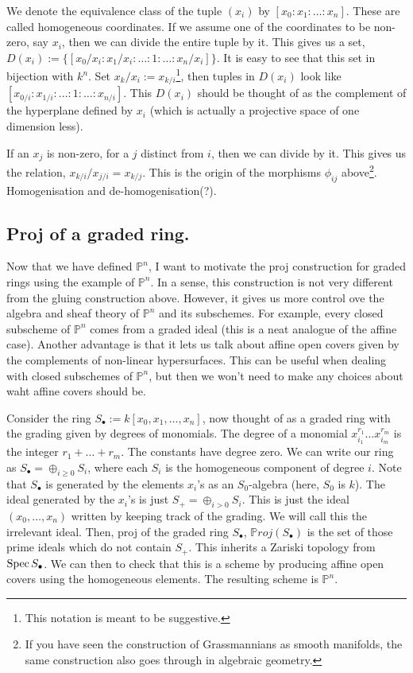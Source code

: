 \documentclass[11pt]{amsart}
\newcommand{\Proj}{{\P roj}}
\newcommand{\Spec}{{\rm Spec \,}}
\renewcommand{\P}{{\mathbb P}}
\theoremstyle{definition}
\begin{document}
We denote the equivalence class of the tuple $(x_i)$ by $[x_0:x_1:\ldots:x_n]$. These are called homogeneous coordinates. If we assume one of the coordinates to be non-zero, say $x_i$, then we can divide the entire tuple by it. This gives us a set, $D(x_i):=\lbrace [x_0/x_i:x_1/x_i:\ldots:1:\ldots:x_n/x_i]\rbrace$. It is easy to see that this set in bijection with $k^n$. Set $x_k/x_i:=x_{k/i}$\footnote{This notation is meant to be suggestive.}, then tuples in $D(x_i)$ look like $[x_{0/i}:x_{1/i}:\ldots:1:\ldots:x_{n/i}]$. This $D(x_i)$ should be thought of as the complement of the hyperplane defined by $x_i$ (which is actually a projective space of one dimension less). 

If an $x_j$ is non-zero, for a $j$ distinct from $i$, then we can divide by it. This gives us the relation, $x_{k/i}/x_{j/i}=x_{k/j}$. This is the origin of the morphisms $\phi_{ij}$ above\footnote{If you have seen the construction of Grassmannians as smooth manifolds, the same construction also goes through in algebraic geometry.}. Homogenisation and de-homogenisation(?).


\subsection{Proj of a graded ring.} Now that we have defined $\P^n$, I want to motivate the proj construction for graded rings using the example of $\P^n$. In a sense, this construction is not very different from the gluing construction above. However, it gives us more control ove the algebra and sheaf theory of $\P^n$ and its subschemes. For example, every closed subscheme of $\P^n$ comes from a graded ideal (this is a neat analogue of the affine case). Another advantage is that it lets us talk about affine open covers given by the complements of non-linear hypersurfaces. This can be useful when dealing with closed subschemes of $\P^n$, but then we won't need to make any choices about waht affine covers should be. 

Consider the ring $S_{\bullet}:=k[x_0,x_1,\ldots,x_n]$, now thought of as a graded ring with the grading given by degrees of monomials. The degree of a monomial $x^{r_1}_{i_1}\ldots x^{r_m}_{i_m}$ is the integer $r_1+\ldots +r_m$. The constants have degree zero. We can write our ring as $S_{\bullet}=\oplus_{i\geq 0}S_i$, where each $S_i$ is the homogeneous component of degree $i$. Note that $S_{\bullet}$ is generated by the elements $x_i$'s as an $S_0$-algebra (here, $S_0$ is $k$). The ideal generated by the $x_i$'s is just $S_{+}=\oplus_{i>0}S_i$. This is just the ideal $(x_0,\ldots,x_n)$ written by keeping track of the grading. We will call this the irrelevant ideal. Then, proj of the graded ring $S_{\bullet}$, $\Proj(S_{\bullet})$ is the set of those  prime ideals which do not contain $S_+$. This inherits a Zariski topology from $\Spec S_{\bullet}$. We can then to check that this is a scheme by producing affine open covers using the homogeneous elements. The resulting scheme is $\P^n$.
\end{document}
